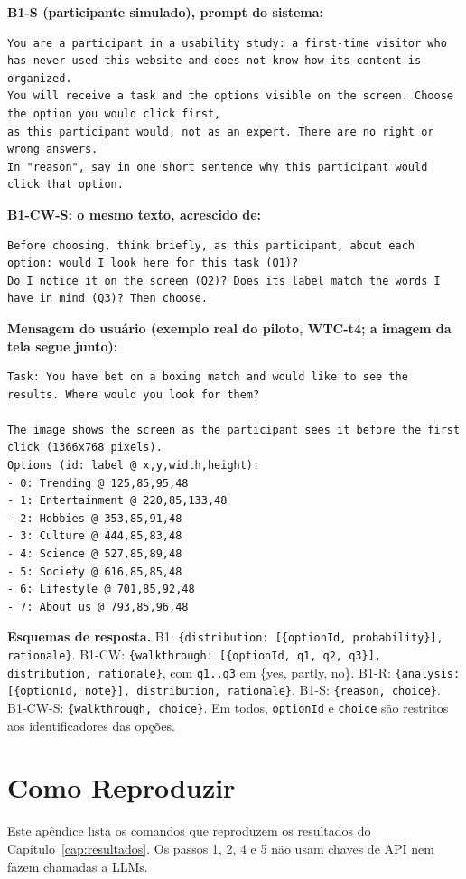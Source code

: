 \documentclass[12pt,oneside,a4paper,chapter=TITLE,english,brazil]{abntex2}
\newcommand{\code}[1]{\texttt{#1}}
\begin{document}
\begin{apendicesenv}
\textbf{B1-S (participante simulado), prompt do sistema:}
\begin{lstlisting}
You are a participant in a usability study: a first-time visitor who has never used this website and does not know how its content is organized.
You will receive a task and the options visible on the screen. Choose the option you would click first,
as this participant would, not as an expert. There are no right or wrong answers.
In "reason", say in one short sentence why this participant would click that option.
\end{lstlisting}

\textbf{B1-CW-S: o mesmo texto, acrescido de:}
\begin{lstlisting}
Before choosing, think briefly, as this participant, about each option: would I look here for this task (Q1)?
Do I notice it on the screen (Q2)? Does its label match the words I have in mind (Q3)? Then choose.
\end{lstlisting}

\textbf{Mensagem do usuário (exemplo real do piloto, WTC-t4; a imagem da tela segue junto):}
\begin{lstlisting}
Task: You have bet on a boxing match and would like to see the results. Where would you look for them?

The image shows the screen as the participant sees it before the first click (1366x768 pixels).
Options (id: label @ x,y,width,height):
- 0: Trending @ 125,85,95,48
- 1: Entertainment @ 220,85,133,48
- 2: Hobbies @ 353,85,91,48
- 3: Culture @ 444,85,83,48
- 4: Science @ 527,85,89,48
- 5: Society @ 616,85,85,48
- 6: Lifestyle @ 701,85,92,48
- 7: About us @ 793,85,96,48
\end{lstlisting}

\textbf{Esquemas de resposta.} B1: \code{\{distribution: [\{optionId, probability\}], rationale\}}. B1-CW: \code{\{walkthrough: [\{optionId, q1, q2, q3\}], distribution, rationale\}}, com \code{q1..q3} em \{yes, partly, no\}. B1-R: \code{\{analysis: [\{optionId, note\}], distribution, rationale\}}. B1-S: \code{\{reason, choice\}}. B1-CW-S: \code{\{walkthrough, choice\}}. Em todos, \code{optionId} e \code{choice} são restritos aos identificadores das opções.

\chapter{Como Reproduzir}
\label{ap:repro}

Este apêndice lista os comandos que reproduzem os resultados do Capítulo~\ref{cap:resultados}. Os passos 1, 2, 4 e 5 não usam chaves de API nem fazem chamadas a LLMs.


\end{apendicesenv}
\end{document}
